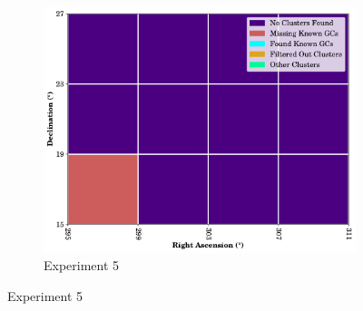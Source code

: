 \begin{figure}[H]
    \begin{subfigure}[b]{0.5\textwidth}
        \includegraphics[width=\textwidth]{./figures/rasters/grids/grid-run-05-a2-4x4.pdf}
        \caption{Experiment 5}
    \end{subfigure}
\end{figure}

